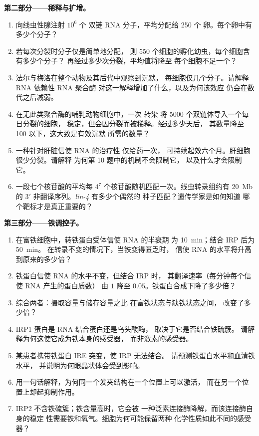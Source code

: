 \begin{problem}
\medskip
\noindent\textbf{第二部分——稀释与扩增。}
\begin{enumerate}[resume]
  \item 向线虫性腺注射 $10^{6}$ 个
        双链 RNA 分子，平均分配给 \num{250} 个
        卵。每个卵中有多少个分子？
  \item 若每次分裂时分子仅是简单地分配，
        则 \num{550} 个细胞的孵化幼虫，每个细胞含有多少个分子？
        再经过多少次分裂，平均值将降至
        每个细胞不足一个？
  \item 法尔与梅洛在整个动物及其后代中观察到沉默，
        每细胞仅几个分子。请解释 RNA 依赖性 RNA 聚合酶
        对这一解释增加了什么，以及为何该效应
        仍会在数代之后减弱。
  \item 在无此类聚合酶的哺乳动物细胞中，一次  转染
        将 \num{5000} 个双链体导入一个每日分裂的细胞，
         稳定，但会因分裂而被稀释。经过多少天后，
        其数量降至 \num{100} 以下，这大致是有效沉默
        所需的数量？
  \item 一种针对肝脏信使 RNA 的治疗性  仅给药一次，
        可持续起效六个月。肝细胞很少分裂。请解释
        为何第 10 题中的机制不会限制它，
        以及什么才会限制它。
  \item 一段七个核苷酸的平均每
        $4^{7}$ 个核苷酸随机匹配一次。线虫转录组约有
        \qty{20}{Mb} 的 3$'$ 非翻译序列。\emph{lin-4} 有多少个偶然的
        种子匹配？遗传学家是如何知道
        哪个靶标才是真正重要的？
\end{enumerate}

\medskip
\noindent\textbf{第三部分——铁调控子。}
\begin{enumerate}[resume]
  \item 在富铁细胞中，转铁蛋白受体信使 RNA 的半衰期
        为 \qty{10}{min}；结合 IRP 后为 \qty{50}{min}。
        在转录不变的情况下，当铁变得匮乏时，
        信使 RNA 的水平将升高到原来的多少倍？
  \item 铁蛋白信使 RNA 的水平不变，但结合 IRP 时，
        其翻译速率（每分钟每个信使 RNA 产生的蛋白质数）
        由 $1$ 降至 $0.05$。铁蛋白合成下降了多少倍？
  \item 综合两者：摄取容量与储存容量之比
        在富铁状态与缺铁状态之间，
        改变了多少倍？
  \item IRP1 蛋白是 RNA 结合蛋白还是乌头酸酶，
        取决于它是否结合铁硫簇。
        请解释为何这使它成为铁本身的感受器，
        而非激素的感受器。
  \item 某患者携带铁蛋白 IRE 突变，使 IRP 无法结合。
        请预测铁蛋白水平和血清铁水平，
        并说明为何眼晶状体会受到影响。
  \item 用一句话解释，为何同一个发夹结构在一个位置上可以激活，
        而在另一个位置上却起抑制作用。
  \item IRP2 不含铁硫簇；铁含量高时，它会被
        一种泛素连接酶降解，而该连接酶自身的稳定
        性需要铁和氧气。细胞为何可能保留两种
        化学性质如此不同的感受器？
\end{enumerate}


\end{problem}
